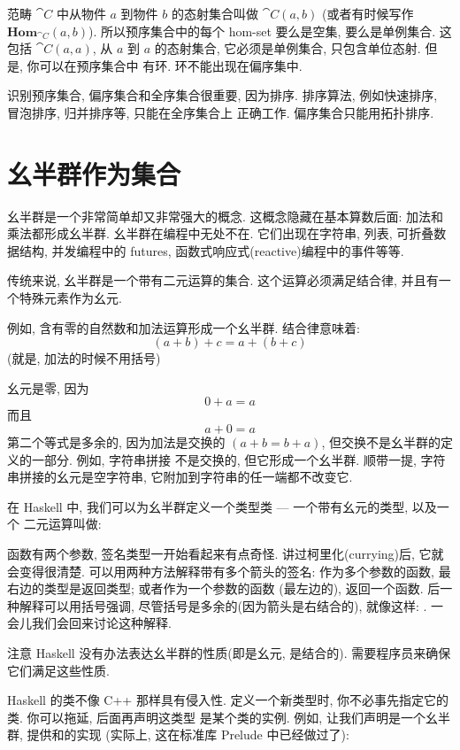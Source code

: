 范畴 $\cat{C}$ 中从物件 $a$ 到物件 $b$ 的态射集合叫做 $\cat{C}(a, b)$ (或者有时候写作
$\mathbf{Hom}_{\cat{C}}(a, b)$). 所以预序集合中的每个 hom-set 要么是空集, 要么是单例集合. 这包括
$\cat{C}(a, a)$, 从 $a$ 到 $a$ 的态射集合, 它必须是单例集合, 只包含单位态射. 但是, 你可以在预序集合中
有环. 环不能出现在偏序集中.

识别预序集合, 偏序集合和全序集合很重要, 因为排序. 排序算法, 例如快速排序, 冒泡排序, 归并排序等, 只能在全序集合上
正确工作. 偏序集合只能用拓扑排序.

\section{幺半群作为集合}

幺半群是一个非常简单却又非常强大的概念. 这概念隐藏在基本算数后面: 加法和乘法都形成幺半群. 幺半群在编程中无处不在.
它们出现在字符串, 列表, 可折叠数据结构, 并发编程中的 futures, 函数式响应式(reactive)编程中的事件等等.

传统来说, 幺半群是一个带有二元运算的集合. 这个运算必须满足结合律, 并且有一个特殊元素作为幺元.

例如, 含有零的自然数和加法运算形成一个幺半群. 结合律意味着:
\[(a + b) + c = a + (b + c)\]
(就是, 加法的时候不用括号)

幺元是零, 因为
\[0 + a = a\]
而且
\[a + 0 = a\]
第二个等式是多余的, 因为加法是交换的 $(a + b = b + a)$, 但交换不是幺半群的定义的一部分. 例如, 字符串拼接
不是交换的, 但它形成一个幺半群. 顺带一提, 字符串拼接的幺元是空字符串, 它附加到字符串的任一端都不改变它.

在 Haskell 中, 我们可以为幺半群定义一个类型类 --- 一个带有幺元的类型, 以及一个
二元运算叫做:


函数有两个参数, 签名类型一开始看起来有点奇怪. 讲过柯里化(currying)后, 它就会变得很清楚.
可以用两种方法解释带有多个箭头的签名: 作为多个参数的函数, 最右边的类型是返回类型; 或者作为一个参数的函数
(最左边的), 返回一个函数. 后一种解释可以用括号强调, 尽管括号是多余的(因为箭头是右结合的), 就像这样:
. 一会儿我们会回来讨论这种解释.

注意 Haskell 没有办法表达幺半群的性质(即是幺元, 是结合的).
需要程序员来确保它们满足这些性质.

Haskell 的类不像 C++ 那样具有侵入性. 定义一个新类型时, 你不必事先指定它的类. 你可以拖延, 后面再声明这类型
是某个类的实例. 例如, 让我们声明是一个幺半群, 提供和的实现
(实际上, 这在标准库 Prelude 中已经做过了):

